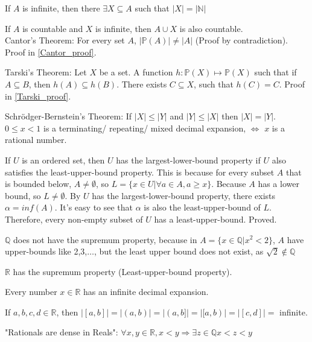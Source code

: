 \documentclass[12pt,a4paper]{ctexrep}
\begin{document}
If $A$ is infinite, then there $\exists X \subseteq A$ such that $|X| = |\mathbb{N}|$

If $A$ is countable and $X$ is infinite, then $A \cup X$ is also countable.\\

Cantor's Theorem:
For every set $A$, $|\mathbb{P}(A)| \neq |A|$ (Proof by contradiction). Proof in \hyperlink{Cantor_proof}{\ref{Cantor_proof}}. \label{Cantor_theorem}\hypertarget{Cantor_theorem}{}

Tarski's Theorem:
Let $X$ be a set. A function $h: \mathbb{P}(X)\mapsto \mathbb{P}(X)$ such that if $A \subseteq B$, then $h(A) \subseteq h(B)$. There exists $C \subseteq X$, such that $h(C)=C$. Proof in \hyperlink{Tarski_proof}{\ref{Tarski_proof}}. \label{Tarski_theorem}\hypertarget{Tarski_theorem}{}

Schr\"odger-Bernstein's Theorem:
If $|X| \leqslant |Y|$ and $|Y| \leqslant |X|$ then $|X| = |Y|$.\\

$0\leqslant x < 1$ is a terminating/ repeating/ mixed decimal expansion, $\iff$ $x$ is a rational number.

If $U$ is an ordered set, then $U$ has the largest-lower-bound property if $U$ also satisfies the least-upper-bound property. This is because for every subset $A$ that is bounded below, $A \neq \emptyset$, so $L = \{x \in U| \forall a \in A, a \geq x\}$. Because $A$ has a lower bound, so $L \neq \emptyset$. By $U$ has the largest-lower-bound property, there exists $\alpha = inf(A)$. It's easy to see that $\alpha$ is also the least-upper-bound of $L$. Therefore, every non-empty subset of $U$ has a least-upper-bound. Proved.

$\mathbb{Q}$ does not have the supremum property, because in $A=\{x \in \mathbb{Q}| x^2<2\}$, $A$ have upper-bounds like 2,3,$\dots$, but the least upper bound does not exist, as $\sqrt{2} \notin \mathbb{Q}$

$\mathbb{R}$ has the supremum property (Least-upper-bound property).

Every number $x\in \mathbb{R}$ has an infinite decimal expansion.

If $a,b,c,d \in \mathbb{R}$, then $|[a,b]| = |(a,b)| = |(a,b]| = |[a,b)| = |[c,d]| = $ infinite.

"Rationals are dense in Reals": $\forall x,y \in \mathbb{R}, x<y \Rightarrow \exists z \in \mathbb{Q} x<z<y$
\end{document}
